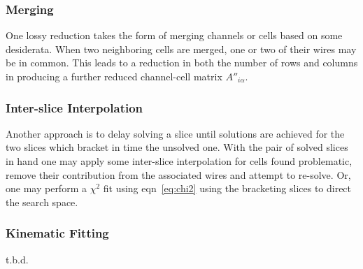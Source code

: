 \documentclass[letter]{article}
\begin{document}
\subsubsection{Merging}

One lossy reduction takes the form of merging channels or cells based on
some desiderata.
When two neighboring cells are merged, one or two of their wires may be in common.
This leads to a reduction in both the number of rows and columns in
producing a further reduced channel-cell matrix $A''_{i\alpha}$.

\subsubsection{Inter-slice Interpolation}

Another approach is to delay solving a slice until solutions are
achieved for the two slices which
bracket in time the unsolved one.
With the pair of solved slices in hand one may apply some inter-slice
interpolation for cells found problematic, remove their contribution
from the associated wires and attempt to re-solve.
Or, one may perform a $\chi^2$ fit using eqn~\ref{eq:chi2} using the
bracketing slices to direct the search space. 

\subsubsection{Kinematic Fitting}
t.b.d.
\end{document}

